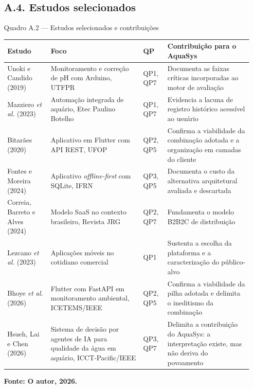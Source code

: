 \documentclass[12pt,oneside,a4paper,brazilian]{abntex2}
\newcommand{\legendaabnt}[1]{%
  \par\vspace{9pt}%
  \begingroup\centering\normalsize\SingleSpacing #1\par\endgroup
  \vspace{3pt}}
\newcommand{\fonteabnt}[1]{%
  \par\vspace{3pt}%
  \begingroup\centering\normalsize\SingleSpacing\bfseries #1\par\endgroup
  \vspace{9pt}}
\begin{document}
\subsection*{A.4. Estudos selecionados}
\legendaabnt{Quadro A.2 --- Estudos selecionados e contribuições}
{\footnotesize\SingleSpacing
\setlength{\LTpre}{0pt}\setlength{\LTpost}{0pt}
\setlength{\extrarowheight}{3pt}
\begin{longtable}{|>{\raggedright\arraybackslash}p{2.0cm}|>{\raggedright\arraybackslash}p{4.5cm}|>{\raggedright\arraybackslash}p{1.0cm}|>{\raggedright\arraybackslash}p{6.1cm}|}
\hline
\textbf{Estudo} & \textbf{Foco} & \textbf{QP} & \textbf{Contribuição para o AquaSys} \\[2pt] \hline \endhead
Unoki e Candido (2019) & Monitoramento e correção de pH com Arduino, UTFPR & QP1, QP7 & Documenta as faixas críticas incorporadas ao motor de avaliação \\[2pt] \hline
Mazziero \textit{et al.} (2023) & Automação integrada de aquário, Etec Paulino Botelho & QP1, QP7 & Evidencia a lacuna de registro histórico acessível ao usuário \\[2pt] \hline
Bitarães (2020) & Aplicativo em Flutter com API REST, UFOP & QP2, QP5 & Confirma a viabilidade da combinação adotada e a organização em camadas do cliente \\[2pt] \hline
Fontes e Moreira (2024) & Aplicativo \textit{offline-first} com SQLite, IFRN & QP3, QP5 & Documenta o custo da alternativa arquitetural avaliada e descartada \\[2pt] \hline
Correia, Barreto e Alves (2024) & Modelo SaaS no contexto brasileiro, Revista JRG & QP2, QP7 & Fundamenta o modelo B2B2C de distribuição \\[2pt] \hline
Lezcano \textit{et al.} (2023) & Aplicações móveis no cotidiano comercial & QP1 & Sustenta a escolha da plataforma e a caracterização do público-alvo \\[2pt] \hline
Bhoye \textit{et al.} (2026) & Flutter com FastAPI em monitoramento ambiental, ICETEMS/IEEE & QP2, QP5 & Confirma a viabilidade da pilha adotada e delimita o ineditismo da combinação \\[2pt] \hline
Hsueh, Lai e Chen (2026) & Sistema de decisão por agentes de IA para qualidade da água em aquário, ICCT-Pacific/IEEE & QP3, QP7 & Delimita a contribuição do AquaSys: a interpretação existe, mas não deriva do povoamento \\[2pt] \hline
\end{longtable}}
\fonteabnt{Fonte: O autor, 2026.}
\end{document}
